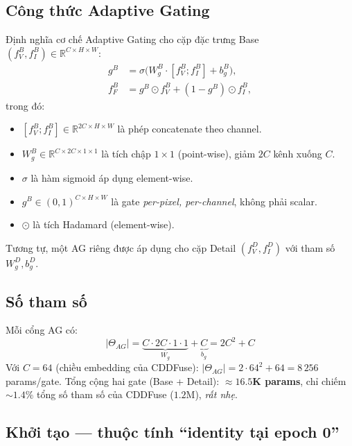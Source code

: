 \subsection{Công thức Adaptive Gating}

Định nghĩa cơ chế Adaptive Gating cho cặp đặc trưng Base $(f_V^B, f_I^B) \in \mathbb{R}^{C \times H \times W}$:
\begin{align}
g^B    &= \sigma\big(W_g^B \cdot [f_V^B; f_I^B] + b_g^B\big), \label{eq:ag-gate} \\
f_F^B  &= g^B \odot f_V^B + (1 - g^B) \odot f_I^B, \label{eq:ag-fuse}
\end{align}
trong đó:
\begin{itemize}\itemsep0pt
    \item $[f_V^B; f_I^B] \in \mathbb{R}^{2C \times H \times W}$ là phép concatenate theo channel.
    \item $W_g^B \in \mathbb{R}^{C \times 2C \times 1 \times 1}$ là tích chập $1 \times 1$ (point-wise), giảm $2C$ kênh xuống $C$.
    \item $\sigma$ là hàm sigmoid áp dụng element-wise.
    \item $g^B \in (0, 1)^{C \times H \times W}$ là gate \emph{per-pixel, per-channel}, không phải scalar.
    \item $\odot$ là tích Hadamard (element-wise).
\end{itemize}

Tương tự, một AG riêng được áp dụng cho cặp Detail $(f_V^D, f_I^D)$ với tham số $W_g^D, b_g^D$.

\subsection{Số tham số}

Mỗi cổng AG có:
\begin{equation}
|\Theta_{AG}| = \underbrace{C \cdot 2C \cdot 1 \cdot 1}_{W_g} + \underbrace{C}_{b_g} = 2C^2 + C
\end{equation}
Với $C = 64$ (chiều embedding của CDDFuse): $|\Theta_{AG}| = 2 \cdot 64^2 + 64 = 8\,256$ params/gate. Tổng cộng hai gate (Base + Detail): $\mathbf{\approx 16.5}$\textbf{K params}, chỉ chiếm $\sim 1.4\%$ tổng số tham số của CDDFuse ($1.2$M), \emph{rất nhẹ}.

\subsection{Khởi tạo --- thuộc tính ``identity tại epoch 0''}
\label{ssec:ag-init}

